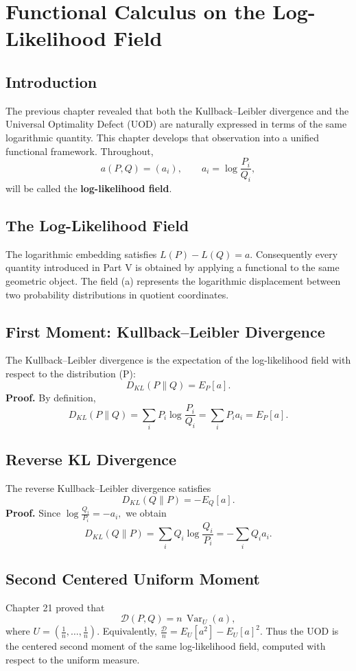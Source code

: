\chapter[Log-Likelihood Field]{Functional Calculus on the Log-Likelihood Field}
\section{Introduction}
The previous chapter revealed that both the Kullback--Leibler divergence
and the Universal Optimality Defect (UOD) are naturally expressed in
terms of the same logarithmic quantity. This chapter develops that
observation into a unified functional framework.
Throughout,
\[ a(P,Q)=\left(a_i\right),\qquad
a_i=\log\frac{P_i}{Q_i}, \]
will be called the \textbf{log-likelihood field}.
\section{The Log-Likelihood Field}
The logarithmic embedding satisfies
$L(P)-L(Q)=a.$
Consequently every quantity introduced in Part V is obtained by
applying a functional to the same geometric object.
The field (a) represents the logarithmic displacement between two
probability distributions in quotient coordinates.
\section{First Moment: Kullback--Leibler Divergence}
\begin{proposition}
\label{ch:prop:27-1}
The Kullback--Leibler divergence is the expectation of the
log-likelihood field with respect to the distribution (P):
\[ \boxed{
D_{KL}(P\|Q)=E_P[a].
} \]
\textbf{Proof.}
By definition,
\[ D_{KL}(P\|Q) = \sum_{i}P_i\log\frac{P_i}{Q_i}
= \sum_{i}P_ia_i = E_P[a]. \]
\end{proposition}
\section{Reverse KL Divergence}
\begin{proposition}
\label{ch:prop:27-2}
The reverse Kullback--Leibler divergence satisfies
\[ \boxed{
D_{KL}(Q\|P)
=
-E_Q[a].
} \]
\textbf{Proof.}
Since
$\log\frac{Q_i}{P_i}=-a_i,$
we obtain
\[ D_{KL}(Q\|P) = \sum_{i}Q_i\log\frac{Q_i}{P_i}
= -\sum_{i}Q_ia_i. \]
\end{proposition}
\section{Second Centered Uniform Moment}
Chapter 21 proved that
\[ \boxed{
\mathcal{D}(P,Q)
=
n\,\operatorname{Var}_U(a),
} \]
where
$U=\left(\frac1n,\ldots,\frac1n\right).$
Equivalently,
$\frac{\mathcal{D}}{n} = E_U[a^{2}]-E_U[a]^{2}.$
Thus the UOD is the centered second moment of the same log-likelihood
field, computed with respect to the uniform measure.
